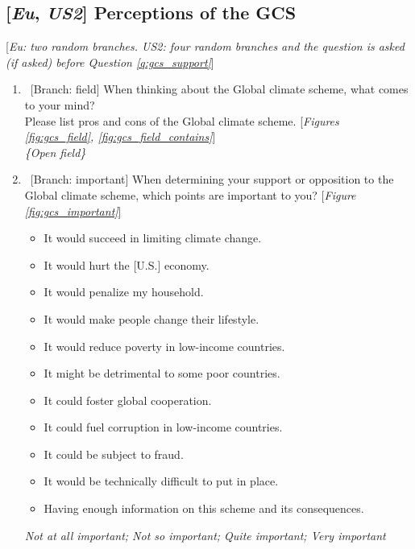\subsection*{[\textit{Eu}, \textit{US2}] Perceptions of the GCS}\label{subsec:questionnaire_perceptions}
[\textit{Eu: two random branches. \textit{US2}: four random branches and the question is asked (if asked) before Question \ref{q:gcs_support}}]
\begin{enumerate}[resume] \item ~[Branch: field] \label{q:gcs_field} When thinking about the Global climate scheme, what comes to your mind? \\ Please list pros and cons of the Global climate scheme. [\textit{Figures \ref{fig:gcs_field}, \ref{fig:gcs_field_contains}}]
\\ \textit{\{Open field\}} 
\item ~[Branch: important] \label{q:gcs_important} When determining your support or opposition to the Global climate scheme, which points are important to you? [\textit{Figure \ref{fig:gcs_important}}]
\begin{itemize}
    \item It would succeed in limiting climate change. 
    \item It would hurt the [U.S.] economy. 
    \item It would penalize my household. 
    \item It would make people change their lifestyle. 
    \item It would reduce poverty in low-income countries. 
    \item It might be detrimental to some poor countries. 
    \item It could foster global cooperation. 
    \item It could fuel corruption in low-income countries. 
    \item It could be subject to fraud. 
    \item It would be technically difficult to put in place. 
    \item Having enough information on this scheme and its consequences. 
\end{itemize}
\textit{Not at all important; Not so important; Quite important; Very important}
\end{enumerate}

